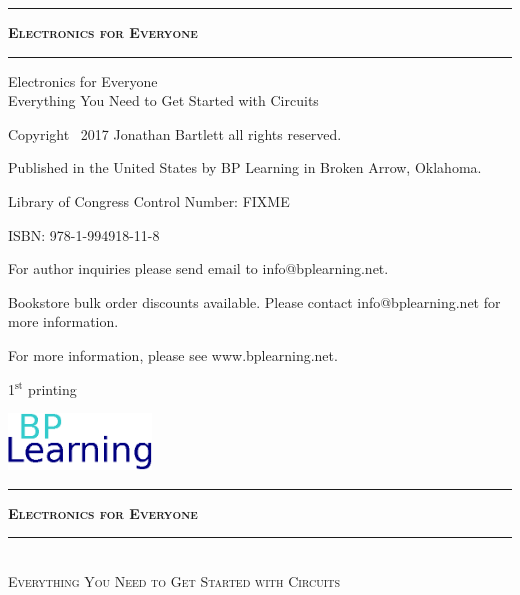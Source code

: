 \begin{titlepage}

\thispagestyle{empty}
\vspace*{\fill}
\begin{center}
\hrule
{\LARGE \textsc{\textbf{Electronics for Everyone}}}
\baselineskip
\hrule
\end{center}
\vspace*{\fill}

\clearpage %

\thispagestyle{empty}
\vspace*{\fill}

{\small
Electronics for Everyone \\
Everything You Need to Get Started with Circuits

Copyright \textcopyright\ 2017 Jonathan Bartlett all rights reserved.

Published in the United States by BP Learning in Broken Arrow, Oklahoma.


Library of Congress Control Number: FIXME

ISBN: 978-1-994918-11-8

For author inquiries please send email to info@bplearning.net.  

Bookstore bulk order discounts available.  Please contact info@bplearning.net for more information.

For more information, please see www.bplearning.net.

1$^{\textrm{st}}$ printing
}
\baselineskip

\includegraphics[width=1.5in]{BPLearning.eps}


\vspace*{\fill}

\clearpage %

\thispagestyle{empty}
\vspace*{\fill}
\begin{center}
\hrule
{\LARGE \textsc{\textbf{Electronics for Everyone}}}
\baselineskip
\hrule
{}\baselineskip
{\Large \textsc{\\ Everything You Need to Get Started with Circuits
}}


\end{center}
\end{titlepage}
